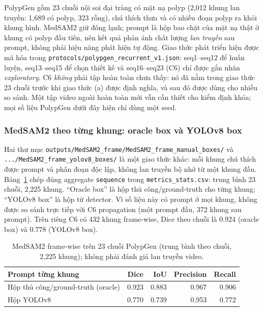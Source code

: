 \documentclass[a4paper,12pt]{report}
\begin{document}
PolypGen gồm 23 chuỗi nội soi đại tràng có mặt nạ polyp (2,012 khung lan truyền: 1,689 có polyp, 323 rỗng), chú thích thưa và có nhiều đoạn polyp ra khỏi khung hình. MedSAM2 giữ đông lạnh; prompt là hộp bao chặt của mặt nạ thật ở khung có polyp đầu tiên, nên kết quả phản ánh chất lượng \emph{lan truyền} sau prompt, không phải hiệu năng phát hiện tự động. Giao thức phát triển hiện được mã hóa trong \texttt{protocols/polypgen\_recurrent\_v1.json}: seq1--seq12 để huấn luyện, seq13--seq15 để chọn thiết kế và seq16--seq23 (C6) chỉ được gắn nhãn \emph{exploratory}. C6 \emph{không} phải tập hoàn toàn chưa thấy: nó đã nằm trong giao thức 23 chuỗi trước khi giao thức (a) được định nghĩa, và sau đó được dùng cho nhiều so sánh. Một tập video ngoài hoàn toàn mới vẫn cần thiết cho kiểm định khóa; mọi số liệu PolypGen dưới đây hiện chỉ dùng một seed.

\subsubsection{MedSAM2 theo từng khung: oracle box và YOLOv8 box}

Hai thư mục \texttt{outputs/MedSAM2\_frame/MedSAM2\_frame\_manual\_boxes/} và \texttt{.../MedSAM2\_frame\_yolov8\_boxes/} là một giao thức khác: mỗi khung chú thích được prompt và phân đoạn độc lập, không lan truyền bộ nhớ từ một khung đầu. Bảng~\ref{tab:framewise-medsam2} chép đúng aggregate \texttt{sequence} trong \texttt{metrics\_stats.csv}: trung bình 23 chuỗi, 2,225 khung. ``Oracle box'' là hộp thủ công/ground-truth cho từng khung; ``YOLOv8 box'' là hộp từ detector. Vì số liệu này có prompt ở mọi khung, không được so sánh trực tiếp với C6 propagation (một prompt đầu, 372 khung sau prompt). Trên riêng C6 có 432 khung frame-wise, Dice theo chuỗi là 0.924 (oracle box) và 0.778 (YOLOv8 box).

\begin{table}[htbp]
\centering
\caption{MedSAM2 frame-wise trên 23 chuỗi PolypGen (trung bình theo chuỗi, 2,225 khung); không phải đánh giá lan truyền video.}
\label{tab:framewise-medsam2}
\begin{tabular}{lrrrr}
\hline
Prompt từng khung & Dice & IoU & Precision & Recall \\
\hline
Hộp thủ công/ground-truth (oracle) & 0.923 & 0.883 & 0.967 & 0.906 \\
Hộp YOLOv8 & 0.770 & 0.739 & 0.953 & 0.772 \\
\hline
\end{tabular}
\end{table}
\end{document}
